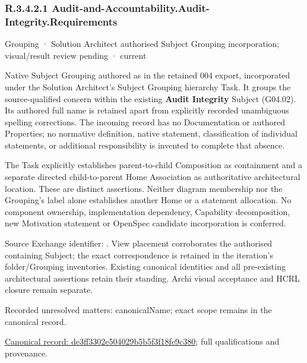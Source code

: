 \subsubsection*{R.3.4.2.1 Audit-and-Accountability.Audit-Integrity.Requirements}
\label{navigation:R.3.4.2.1}

\label{element:de3ff3302e504029b5b5f3f18fe9c380}
{\small Grouping · Solution Architect authorised Subject Grouping incorporation; visual/result review pending · current}\par

Native Subject Grouping authored as \texttt{} in the retained 004 export,
incorporated under the Solution Architect's Subject Grouping hierarchy Task.
It groups the source-qualified \texttt{} concern within
the existing \textbf{Audit Integrity} Subject (G04.02). Its authored full name
is retained apart from explicitly recorded unambiguous spelling corrections.
The incoming record has no Documentation or authored Properties; no normative
definition, native statement, classification of individual statements, or
additional responsibility is invented to complete that absence.



The Task explicitly establishes parent-to-child Composition as containment and
a separate directed child-to-parent Home Association as authoritative architectural
location. These are distinct assertions. Neither diagram membership nor the
Grouping's label alone establishes another Home or a statement allocation.
No component ownership, implementation dependency, Capability decomposition,
new Motivation statement or OpenSpec candidate incorporation is conferred.



Source Exchange identifier: \texttt{}. View placement corroborates
the authorised containing Subject; the exact correspondence is retained in the
iteration's folder/Grouping inventories. Existing canonical identities and all
pre-existing architectural assertions retain their standing. Archi visual
acceptance and HCRL closure remain separate.


{\small Recorded unresolved matters: canonicalName; exact scope remains in the canonical record.}\par
{\footnotesize \href{../../../../continuum/grouping/de3ff3302e504029b5b5f3f18fe9c380.md}{Canonical record: de3ff3302e504029b5b5f3f18fe9c380}; full qualifications and provenance.}\par
